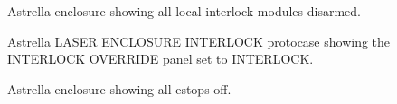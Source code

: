 \documentclass[letterpaper,10pt,english]{sphinxmanual}
\begin{document}
\begin{figure}[htbp]
\centering
\capstart

\noindent{}
\caption{ Astrella enclosure showing all local interlock modules disarmed.}\label{\detokenize{testing_documentation/Hutch-1_laser:id4}}\end{figure}

\begin{figure}[htbp]
\centering
\capstart

\noindent{}
\caption{ Astrella LASER ENCLOSURE INTERLOCK protocase showing the INTERLOCK OVERRIDE panel set to INTERLOCK.}\label{\detokenize{testing_documentation/Hutch-1_laser:id5}}\end{figure}

\begin{figure}[htbp]
\centering
\capstart

\noindent{}
\caption{ Astrella enclosure showing all e\sphinxhyphen{}stops off.}\label{\detokenize{testing_documentation/Hutch-1_laser:id6}}\end{figure}
\end{document}
